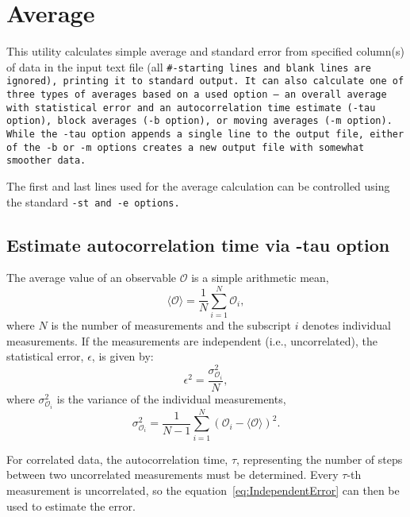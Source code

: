 \section{Average} \label{sec:Average}

This utility calculates simple average and standard error from specified
column(s) of data in the input text file (all \tt{\#}-starting lines and blank
lines are ignored), printing it to standard output. It can also calculate one of
three types of averages based on a used option -- an overall average with
statistical error and an autocorrelation time estimate (\tt{-tau} option), block
averages (\tt{-b} option), or moving averages (\tt{-m} option). While the
\tt{-tau} option appends a single line to the output file, either of the \tt{-b}
or \tt{-m} options creates a new output file with somewhat smoother data.

The first and last lines used for the average calculation can be controlled
using the standard \tt{-st} and \tt{-e} options.

\subsection{Estimate autocorrelation time via -tau option}

The average value of an observable $\mathcal{O}$ is a simple arithmetic
mean,
\begin{equation} \label{eq:Average} %
  \langle\mathcal{O}\rangle = \frac{1}{N} \sum^N_{i=1} \mathcal{O}_i,
\end{equation} %
where $N$ is the number of measurements and the subscript $i$ denotes
individual measurements. If the measurements are independent (i.e.,
uncorrelated), the statistical error, $\epsilon$, is given by:
\begin{equation} \label{eq:IndependentError} %
  \epsilon^2 =
    \frac{\sigma^2_{\mathcal{O}_i}}{N},
\end{equation} %
where $\sigma^2_{\mathcal{O}_i}$
is the variance of the individual
measurements,
\begin{equation} %
  \sigma^2_{\mathcal{O}_i} = \frac{1}{N-1} \sum^N_{i=1} (\mathcal{O}_i -
  \langle\mathcal{O}\rangle)^2.
\end{equation} %

For correlated data, the autocorrelation time,
$\tau$, representing the number of steps between two uncorrelated
measurements must be determined. Every
$\tau$-th measurement is uncorrelated, so the
equation~\eqref{eq:IndependentError} can then be used to estimate the
error.


